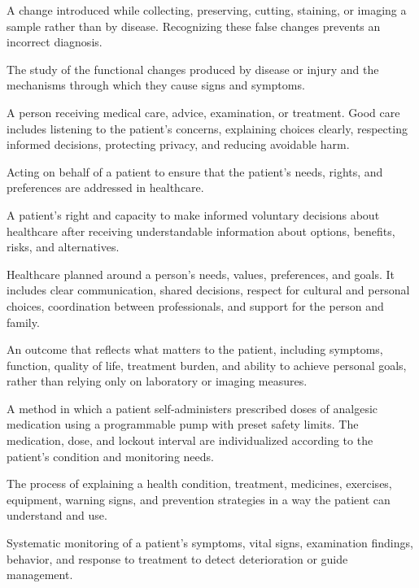  A change introduced while collecting, preserving, cutting, staining, or imaging a sample rather than by disease. Recognizing these false changes prevents an incorrect diagnosis.

 The study of the functional changes produced by disease or injury and the mechanisms through which they cause signs and symptoms.

 A person receiving medical care, advice, examination, or treatment. Good care includes listening to the patient's concerns, explaining choices clearly, respecting informed decisions, protecting privacy, and reducing avoidable harm.

 Acting on behalf of a patient to ensure that the patient's needs, rights, and
preferences are addressed in healthcare.

 A patient’s right and capacity to make informed voluntary decisions about healthcare after receiving understandable information about options, benefits, risks, and alternatives.

 Healthcare planned around a person's needs, values, preferences, and goals. It includes clear communication, shared decisions, respect for cultural and personal choices, coordination between professionals, and support for the person and family.

 An outcome that reflects what matters to the patient, including symptoms, function,
quality of life, treatment burden, and ability to achieve personal goals, rather than
relying only on laboratory or imaging measures.

 A method in which a patient self-administers prescribed doses of analgesic medication
using a programmable pump with preset safety limits. The medication, dose, and lockout interval
are individualized according to the patient's condition and monitoring needs.

 The process of explaining a health condition, treatment, medicines, exercises, equipment, warning signs, and prevention strategies in a way the patient can understand and use.

 Systematic monitoring of a patient’s symptoms, vital signs, examination findings, behavior, and response to treatment to detect deterioration or guide management.

